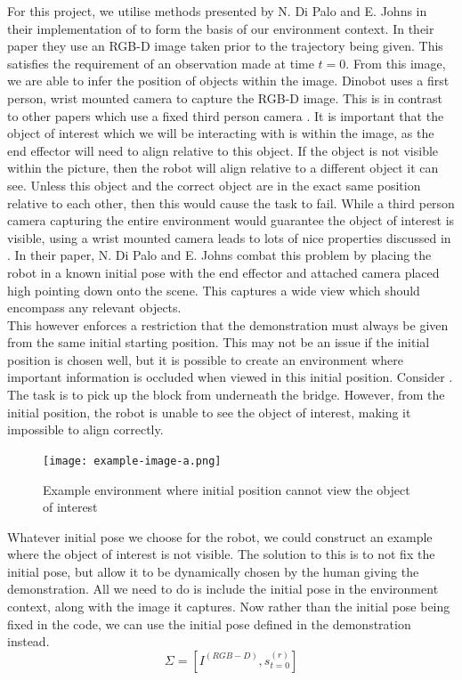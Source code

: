 For this project, we utilise methods presented by N. Di Palo and E. Johns in their implementation of  \cite{one-shot-imitation} to form the basis of our environment context. In their paper they use an RGB-D image taken prior to the trajectory being given. This satisfies the requirement of an observation made at time $t=0$. From this image, we are able to infer the position of objects within the image. Dinobot uses a first person, wrist mounted camera to capture the RGB-D image. This is in contrast to other papers which use a fixed third person camera \cite{one-shot-pose-estimate}.
It is important that the object of interest which we will be interacting with is within the image, as the end effector will need to align relative to this object. If the object is not visible within the picture, then the robot will align relative to a different object it can see. Unless this object and the correct object are in the exact same position relative to each other, then this would cause the task to fail. 
While a third person camera capturing the entire environment would guarantee the object of interest is visible, using a wrist mounted camera leads to lots of nice properties discussed in . In their paper, N. Di Palo and E. Johns combat this problem by placing the robot in a known initial pose with the end effector and attached camera placed high pointing down onto the scene. This captures a wide view which should encompass any relevant objects.\\

This however enforces a restriction that the demonstration must always be given from the same initial starting position. This may not be an issue if the initial position is chosen well, but it is possible to create an environment where important information is occluded when viewed in this initial position. Consider . The task is to pick up the block from underneath the bridge. However, from the initial position, the robot is unable to see the object of interest, making it impossible to align correctly.

\begin{figure}[h]
    \centering
    \texttt{[image: example-image-a.png]}
    \caption{Example environment where initial position cannot view the object of interest}
    \label{fig:occluded}
\end{figure}

Whatever initial pose we choose for the robot, we could construct an example where the object of interest is not visible. The solution to this is to not fix the initial pose, but allow it to be dynamically chosen by the human giving the demonstration. All we need to do is include the initial pose in the environment context, along with the image it captures. Now rather than the initial pose being fixed in the code, we can use the initial pose defined in the demonstration instead.
$$\Sigma = [I^{(RGB-D)}, s^{(r)}_{t=0}]$$

